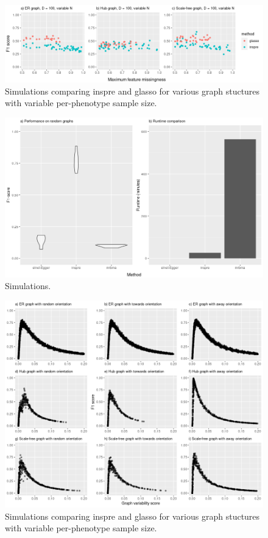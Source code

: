 \documentclass{article}
\begin{document}
\newpage
\begin{figure}[H]\label{figureS2}
\includegraphics[width=\textwidth]{figures/figure_S2.png}
\caption{Simulations comparing inspre and glasso for various graph stuctures
with variable per-phenotype sample size.}
\end{figure}

\newpage
\begin{figure}[H]\label{figureS4}
\includegraphics[width=\textwidth]{figures/figure_S4.png}
\caption{Simulations.}
\end{figure}

\newpage
\begin{figure}[H]\label{figureS3}
\includegraphics[width=\textwidth]{figures/figure_S3.png}
\caption{Simulations comparing inspre and glasso for various graph stuctures
with variable per-phenotype sample size.}
\end{figure}
\end{document}
